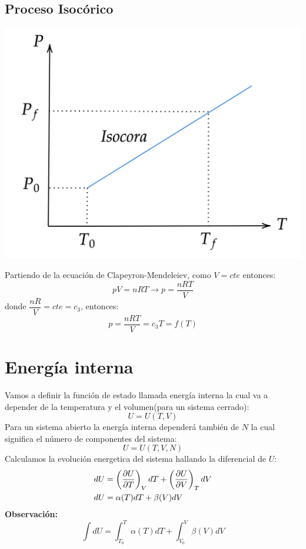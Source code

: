 \documentclass[../main]{subfiles}
\begin{document}
\section{Proceso Isocórico}
\begin{minipage}{0.5\textwidth}
    \includegraphics[scale=0.24]{Termodinámica/images/isocora.png}
\end{minipage}
\begin{minipage}{0.5\textwidth}
    Partiendo de la ecuación de Clapeyron-Mendeleiev, como $V=cte$ entonces:
    \begin{equation*}
        pV=nRT \rightarrow p=\dfrac{nRT}{V}
    \end{equation*}
    donde $\dfrac{nR}{V}=cte=c_3$, entonces:
    \begin{equation*}
        p=\dfrac{nRT}{V}=c_3 T=f(T)
    \end{equation*}
\end{minipage}
\chapter{Energía interna}
Vamos a definir la función  de estado llamada energía interna la cual va a depender de la temperatura y el volumen(para un sistema cerrado):
\begin{equation}
    U=U(T,V)
\end{equation}
Para un sistema abierto la energía interna dependerá también de $N$ la cual significa el número de componentes del sistema:
\begin{equation}
    U=U(T,V,N)
\end{equation}
Calculamos la evolución energetica del sistema hallando la diferencial de $U$:
\begin{align}
    dU&=\left( \pdv{U}{T} \right)_V dT + \left( \pdv{U}{V} \right)_T dV \\
    dU&=\alpha(T)dT+\beta(V)dV
\end{align}
\textbf{Observación:}
\begin{equation}
    \boxed{\int dU=\int_{T_0}^T \alpha(T)dT+\int_{V_0}^V \beta(V)dV}
\end{equation}
\end{document}
